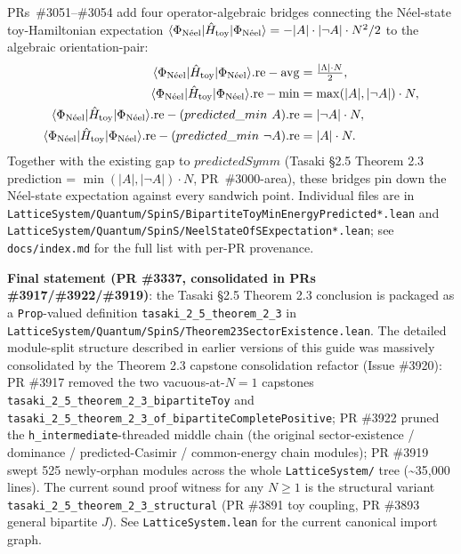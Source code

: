 \documentclass[a4paper,11pt]{article}
\begin{document}
PRs~\#3051--\#3054 add four operator-algebraic bridges connecting the
Néel-state toy-Hamiltonian expectation $\langle \Phi_{\rm N\acute eel}|
\hat H_{\rm toy}|\Phi_{\rm N\acute eel}\rangle = -|A|\cdot|\neg A|\cdot
N^2/2$ to the algebraic orientation-pair:
\begin{align*}
  \langle \Phi_{\rm N\acute eel}|\hat H_{\rm toy}|\Phi_{\rm N\acute eel}\rangle.\mathrm{re} - \mathrm{avg} &= \tfrac{|\Lambda|\cdot N}{2}, \\
  \langle \Phi_{\rm N\acute eel}|\hat H_{\rm toy}|\Phi_{\rm N\acute eel}\rangle.\mathrm{re} - \min &= \max(|A|, |\neg A|)\cdot N, \\
  \langle \Phi_{\rm N\acute eel}|\hat H_{\rm toy}|\Phi_{\rm N\acute eel}\rangle.\mathrm{re} - (predicted\_min\ A).\mathrm{re} &= |\neg A|\cdot N, \\
  \langle \Phi_{\rm N\acute eel}|\hat H_{\rm toy}|\Phi_{\rm N\acute eel}\rangle.\mathrm{re} - (predicted\_min\ \neg A).\mathrm{re} &= |A|\cdot N.
\end{align*}
Together with the existing gap to $predictedSymm$ (Tasaki §2.5
Theorem 2.3 prediction = $\min(|A|, |\neg A|)\cdot N$, PR~\#3000-area),
these bridges pin down the Néel-state expectation against every
sandwich point. Individual files are in
\texttt{LatticeSystem/Quantum/SpinS/BipartiteToyMinEnergyPredicted*.lean}
and
\texttt{LatticeSystem/Quantum/SpinS/NeelStateOfSExpectation*.lean};
see \texttt{docs/index.md} for the full list with per-PR provenance.

\textbf{Final statement (PR \#3337, consolidated in PRs \#3917/\#3922/\#3919)}: the Tasaki \S2.5 Theorem 2.3 conclusion is packaged as a \texttt{Prop}-valued definition \texttt{tasaki\_2\_5\_theorem\_2\_3} in \texttt{LatticeSystem/Quantum/SpinS/Theorem23SectorExistence.lean}. The detailed module-split structure described in earlier versions of this guide was massively consolidated by the Theorem 2.3 capstone consolidation refactor (Issue \#3920): PR \#3917 removed the two vacuous-at-\(N=1\) capstones \texttt{tasaki\_2\_5\_theorem\_2\_3\_bipartiteToy} and \texttt{tasaki\_2\_5\_theorem\_2\_3\_of\_bipartiteCompletePositive}; PR \#3922 pruned the \texttt{h\_intermediate}-threaded middle chain (the original sector-existence / dominance / predicted-Casimir / common-energy chain modules); PR \#3919 swept 525 newly-orphan modules across the whole \texttt{LatticeSystem/} tree (\textasciitilde 35{,}000 lines). The current sound proof witness for any \(N \ge 1\) is the structural variant \texttt{tasaki\_2\_5\_theorem\_2\_3\_structural} (PR \#3891 toy coupling, PR \#3893 general bipartite \(J\)). See \texttt{LatticeSystem.lean} for the current canonical import graph.
\end{document}
